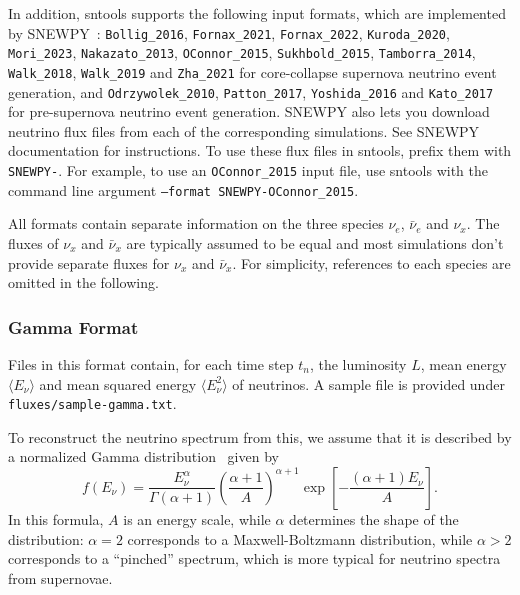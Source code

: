 \documentclass[11pt, oneside]{article}
\newcommand{\mean}[1]{\ensuremath{\langle #1 \rangle}}
\newcommand{\nue}{\ensuremath{\nu_e}\xspace}
\newcommand{\nux}{\ensuremath{\nu_x}\xspace}
\newcommand{\nuebar}{\ensuremath{\bar{\nu}_e}\xspace}
\newcommand{\nuxbar}{\ensuremath{\bar{\nu}_x}\xspace}
\begin{document}
In addition, sntools supports the following input formats, which are implemented by SNEWPY~\cite{Baxter2021,SNEWS:2021ezc}:
\texttt{Bollig\_2016},
\texttt{Fornax\_2021},
\texttt{Fornax\_2022},
\texttt{Kuroda\_2020},
\texttt{Mori\_2023},
\texttt{Nakazato\_2013},
\texttt{OConnor\_2015},
\texttt{Sukhbold\_2015},
\texttt{Tamborra\_2014},
\texttt{Walk\_2018},
\texttt{Walk\_2019} and
\texttt{Zha\_2021} for core-collapse supernova neutrino event generation,
and 
\texttt{Odrzywolek\_2010},
\texttt{Patton\_2017},
\texttt{Yoshida\_2016} and 
\texttt{Kato\_2017} for pre-supernova neutrino event generation.
SNEWPY also lets you download neutrino flux files from each of the corresponding simulations. See SNEWPY documentation for instructions.
To use these flux files in sntools, prefix them with \texttt{SNEWPY-}. For example, to use an \texttt{OConnor\_2015} input file, use sntools with the command line argument \texttt{--format SNEWPY-OConnor\_2015}.


All formats contain separate information on the three species \nue, \nuebar and \nux.
The fluxes of \nux and \nuxbar are typically assumed to be equal and most simulations don’t provide separate fluxes for \nux and \nuxbar.
For simplicity, references to each species are omitted in the following.

\subsubsection{Gamma Format}\label{sec:format-gamma}
Files in this format contain, for each time step $t_n$, the luminosity $L$, mean energy $\mean{E_\nu}$ and mean squared energy $\mean{E_\nu^2}$ of neutrinos.
A sample file is provided under \texttt{fluxes/sample-gamma.txt}.
%

To reconstruct the neutrino spectrum from this, we assume that it is described by a normalized Gamma distribution~\cite{Keil2003,Tamborra2012} given by
\begin{equation}
f (E_\nu) = \frac{E_\nu^\alpha}{\Gamma (\alpha + 1)} \left( \frac{\alpha + 1}{A} \right)^{\alpha + 1} \exp \left[ - \frac{(\alpha + 1) E_\nu}{A} \right].
\end{equation}
In this formula, $A$ is an energy scale, while $\alpha$ determines the shape of the distribution: $\alpha = 2$ corresponds to a Maxwell-Boltzmann distribution, while $\alpha > 2$ corresponds to a “pinched” spectrum, which is more typical for neutrino spectra from supernovae.
\end{document}
